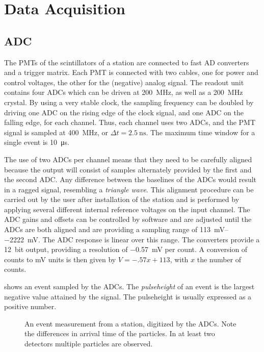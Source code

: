 \section{Data Acquisition}
\label{sec:data-acquisition}

\subsection{ADC}

The PMTs of the scintillators of a \hisparc station are connected to fast AD
converters and a trigger matrix. Each PMT is connected with two cables, one for
power and control voltages, the other for the (negative) analog signal.  The
readout unit contains four ADCs which can be driven at \SI{200}{\mega\hertz}, as well as
a \SI{200}{\mega\hertz} crystal.
By using a very stable clock, the sampling frequency can be doubled by driving
one ADC on the rising edge of the clock signal, and one ADC on the falling edge,
for each channel.  Thus, each channel uses two ADCs, and the PMT signal is
sampled at \SI{400}{\mega\hertz}, or $\Delta t = \SI{2.5}{\nano\second}$. The
maximum time window for a single event is \SI{10}{\micro\second}.

The use of two ADCs per channel means that they need to be carefully aligned
because the output will consist of samples alternately provided by the first and
the second ADC.  Any difference between the baselines of the ADCs would result
in a ragged signal, resembling a \emph{triangle wave}.  This alignment procedure
can be carried out by the user after installation of the station and is
performed by applying several different internal reference voltages on the input
channel.  The ADC gains and offsets can be controlled by software and are
adjusted until the ADCs are both aligned and are providing a sampling range of
\SIrange[retain-explicit-plus]{+113}{-2222}{\milli\volt}. The ADC response is
linear over this range. The converters provide a \SI{12}{bit} output,
providing a resolution of \SI{-.57}{\milli\volt} per \adc count.  A conversion
of \adc counts to \si{\milli\volt} units is then given by $V = -.57x + 113$,
with $x$ the number of \adc counts.

 shows an event sampled by the ADCs.
The \emph{pulseheight} of an event is the largest negative value attained by the
signal. The pulseheight is usually expressed as a positive number.

\begin{figure}
\centering

\caption{An event measurement from a \hisparc station, digitized by the ADCs.
Note the differences in arrival time of the particles. In at least two
detectors multiple particles are observed.}
\label{fig:traces}
\end{figure}


